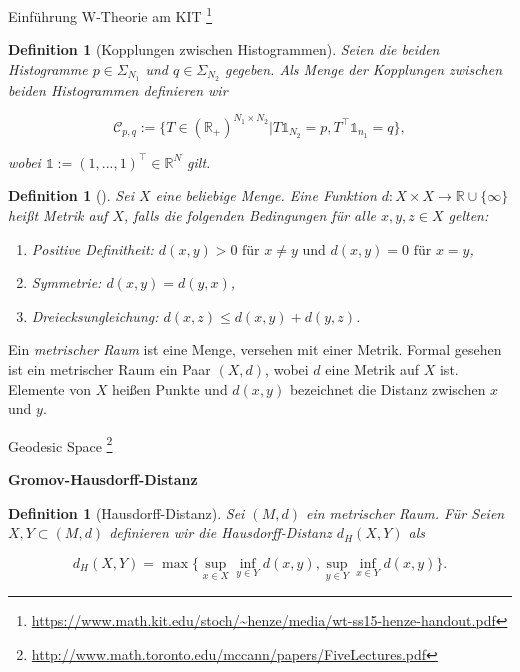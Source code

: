 \documentclass[11pt,a4paper]{article}
\def\emph#1{\textit{#1}}
\newtheorem{definition}[theorem]{Definition}
\numberwithin{equation}{section}
\begin{document}
	
Einführung W-Theorie am KIT \footnote{\url{https://www.math.kit.edu/stoch/~henze/media/wt-ss15-henze-handout.pdf}}
	\begin{definition}[Kopplungen zwischen Histogrammen]
		Seien die beiden Histogramme $p \in \Sigma_{N_1}$ und $q \in \Sigma_{N_2}$ gegeben.
		Als Menge der Kopplungen zwischen beiden Histogrammen definieren wir
		
		\begin{equation*}
		\mathcal{C}_{p,q} := \lbrace T \in (\mathbb{R}_+)^{N_1 \times N_2} | T \mathbb{1}_{N_2} = p, T^\top \mathbb{1}_{n_1} = q \rbrace,
		\end{equation*}	
		
		wobei $\mathbb{1} := (1,...,1)^\top \in \mathbb{R}^{N}$ gilt.
	\end{definition}
	
	

	\begin{definition}[\cite{burago2001course}]
		Sei $X$ eine beliebige Menge. Eine Funktion $d:X \times X \to \mathbb{R} \cup \lbrace \infty \rbrace$ heißt \emph{Metrik} auf $X$, falls die folgenden Bedingungen für alle $x,y,z \in X$ gelten:
		\begin{enumerate}[label={(\arabic*)}]
			\item Positive Definitheit: $d(x,y) > 0 \text{ für } x \neq y \text{ und } d(x,y)=0 \text{ für } x=y$,
			\item Symmetrie: $d(x,y)=d(y,x)$,
			\item Dreiecksungleichung: $d(x,z) \leq d(x,y) + d(y,z)$.	
		\end{enumerate}
	\end{definition}
	Ein \emph{metrischer Raum} ist eine Menge, versehen mit einer Metrik. Formal gesehen ist ein metrischer Raum ein Paar $(X,d)$, wobei $d$ eine Metrik auf $X$ ist. Elemente von $X$ heißen Punkte und $d(x,y)$ bezeichnet die Distanz zwischen $x$ und $y$.
	
	
	
	

	Geodesic Space \footnote{\url{http://www.math.toronto.edu/mccann/papers/FiveLectures.pdf}}
	
	\noindent \textbf{Gromov-Hausdorff-Distanz}
	
	\begin{definition}[Hausdorff-Distanz]
		Sei $(M,d)$ ein metrischer Raum.
		Für 
		Seien $X,Y \subset (M,d)$ definieren wir die \emph{Hausdorff-Distanz} $d_H(X,Y)$ als
		
		\begin{equation}
		d_H(X,Y) = \max \lbrace \sup_{x \in X} \inf_{y \in Y} d(x,y), \sup_{y \in Y} \inf_{x \in Y} d(x,y) \rbrace .
		\end{equation} 
		
	\end{definition}
	
\end{document}
